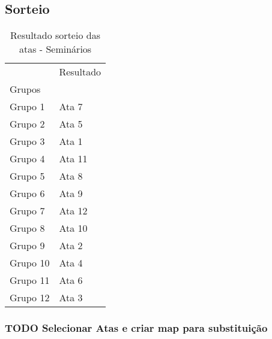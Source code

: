 \documentclass[11pt]{article}
\begin{document}
\subsection{Sorteio}
\label{sec:org5816f9c}
\begin{table}
\centering
\caption{Resultado sorteio das atas - Seminários}
\begin{tabular}{ll}
\toprule
{} & Resultado \\
Grupos   &           \\
\midrule
Grupo 1  &     Ata 7 \\
Grupo 2  &     Ata 5 \\
Grupo 3  &     Ata 1 \\
Grupo 4  &    Ata 11 \\
Grupo 5  &     Ata 8 \\
Grupo 6  &     Ata 9 \\
Grupo 7  &    Ata 12 \\
Grupo 8  &    Ata 10 \\
Grupo 9  &     Ata 2 \\
Grupo 10 &     Ata 4 \\
Grupo 11 &     Ata 6 \\
Grupo 12 &     Ata 3 \\
\bottomrule
\end{tabular}
\end{table}


\subsubsection{{\bfseries\sffamily TODO} Selecionar Atas e criar map para substituição}
\label{sec:orgd5c74b8}
\end{document}
